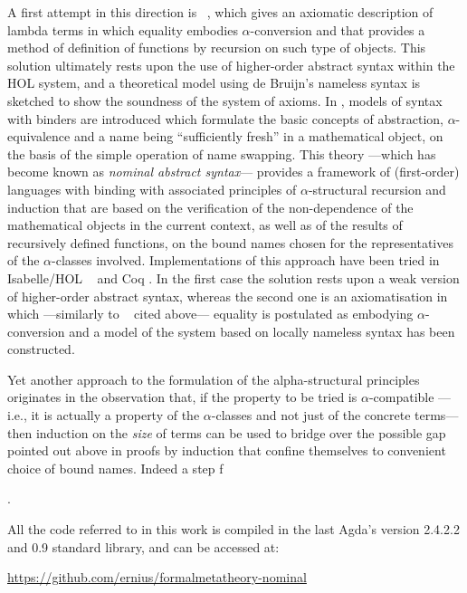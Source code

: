 \documentclass{entcs}
\begin{document}
A first attempt in this direction is ~\cite{DBLP:conf/tphol/GordonM96}, which gives an axiomatic description of lambda terms in which equality embodies $\alpha$-conversion and that provides a method of definition of functions by recursion on such type of objects. This solution ultimately rests upon the use of higher-order abstract syntax within the HOL system, and a theoretical model using de Bruijn's nameless syntax is sketched to show the soundness of the system of axioms.
In \cite{Gabbay, Pitts1, Pitts2}, models of syntax with binders are introduced which formulate the basic concepts of abstraction, $\alpha$-equivalence and a name being ``sufficiently fresh'' in a mathematical object, on the basis of the simple operation of name swapping. This theory ---which has become known as \emph{nominal abstract syntax}--- provides a framework of (first-order) languages with binding with associated principles of $\alpha$-structural recursion and induction that are based on the verification of the non-dependence of the mathematical objects in the current context, as well as of the results of recursively defined functions, on the bound names chosen for the representatives of the $\alpha$-classes involved.
Implementations of this approach have been tried in Isabelle/HOL ~\cite{urban05} and Coq \cite{aydemir}. In the first case the solution rests upon a weak version of higher-order abstract syntax, whereas the second one is an axiomatisation in which ---similarly to ~\cite{DBLP:conf/tphol/GordonM96} cited above--- equality is postulated as embodying $\alpha$-conversion and a model of the system based on locally nameless syntax has been constructed.

Yet another approach to the formulation of the alpha-structural principles originates in the observation that, if the property to be tried is $\alpha$-compatible ---i.e., it is actually a property of the $\alpha$-classes and not just of the concrete terms--- then induction on the \emph{size} of terms can be used to bridge over the possible gap pointed out above in proofs by induction that confine themselves to convenient choice of bound names. Indeed a step f

 .

\hfill


All the code referred to in this work is compiled in the last Agda's version 2.4.2.2 and 0.9 standard library, and can be accessed at:

\begin{center}
  \href{https://github.com/ernius/formalmetatheory-nominal}{https://github.com/ernius/formalmetatheory-nominal}
\end{center}
\end{document}
